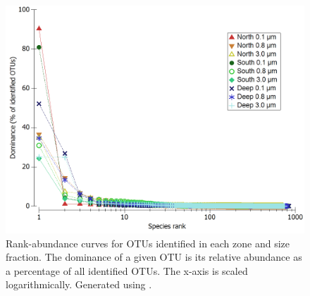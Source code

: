 \begin{figure}
  \centering
  \includegraphics[width=\textwidth]{../polarfront/rankabundance.png}
  \caption[Rank-abundance curves for \acp{OTU} in each zone and size fraction]{Rank-abundance curves for \acp{OTU} identified in each zone and size fraction. The dominance of a given OTU is its relative abundance as a percentage of all identified \acp{OTU}. The x-axis is scaled logarithmically. Generated using .}
  \label{fig:rankabundance}
\end{figure}
